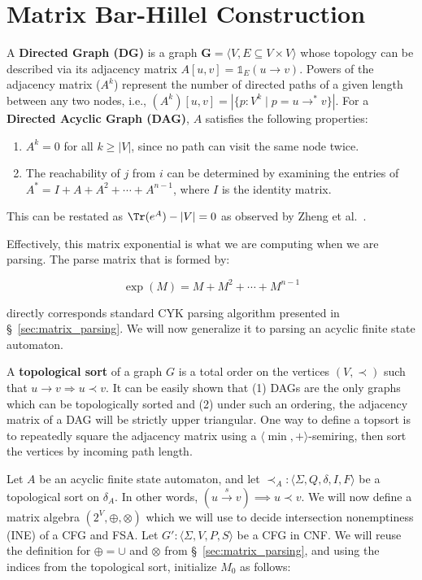 \section{Matrix Bar-Hillel Construction}

A \textbf{Directed Graph (DG)} is a graph $\mathbf{G} = \langle V, E \subseteq V \times V\rangle$ whose topology can be described via its adjacency matrix $A[u, v] = \mathds{1}_E(u\rightarrow v)$. Powers of the adjacency matrix ($A^k$) represent the number of directed paths of a given length between any two nodes, i.e., $(A^k)[u,v] = |\{ p: V^k \mid p=u \rightarrow^* v\}|$. For a \textbf{Directed Acyclic Graph (DAG)}, $A$ satisfies the following properties:

\begin{enumerate}
\item $A^k = 0$ for all \( k \geq |V| \), since no path can visit the same node twice.
\item The reachability of $j$ from $i$ can be determined by examining the entries of $A^* = I + A + A^2 + \cdots + A^{n-1}$, where $I$ is the identity matrix.
\end{enumerate}

\noindent This can be restated as $\Tr(e^A) - |V| = 0$ as observed by Zheng et al.~\cite{zheng2018dags}.

Effectively, this matrix exponential is what we are computing when we are parsing. The parse matrix that is formed by:

\begin{equation}
  \exp(M) = M + M^2 + \cdots + M^{n-1}
\end{equation}

\noindent directly corresponds standard CYK parsing algorithm presented in \S~\ref{sec:matrix_parsing}. We will now generalize it to parsing an acyclic finite state automaton.

A \textbf{topological sort} of a graph $G$ is a total order on the vertices $(V, \prec)$ such that $u \rightarrow v \Longrightarrow u \prec v$. It can be easily shown that (1) DAGs are the only graphs which can be topologically sorted and (2) under such an ordering, the adjacency matrix of a DAG will be strictly upper triangular. One way to define a topsort is to repeatedly square the adjacency matrix using a $\langle \min, +\rangle$-semiring, then sort the vertices by incoming path length.

Let $A$ be an acyclic finite state automaton, and let $\prec_A: \langle \Sigma, Q, \delta, I, F\rangle$ be a topological sort on $\delta_A$. In other words, $(u \overset{s}{\rightarrow} v) \implies u \prec v$. We will now define a matrix algebra $(2^V, \oplus, \otimes)$ which we will use to decide intersection nonemptiness (INE) of a CFG and FSA. Let $G':\langle \Sigma, V, P, S\rangle$ be a CFG in CNF. We will reuse the definition for $\oplus = \cup$ and $\otimes$ from \S~\ref{sec:matrix_parsing}, and using the indices from the topological sort, initialize $M_0$ as follows:


